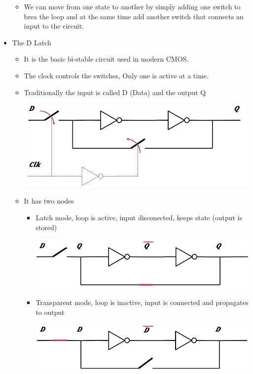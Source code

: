 \documentclass[a4paper]{article}
\begin{document}
\begin{itemize}
\begin{itemize}
\begin{center}
					\end{center}
				\item We can move from one state to another by simply adding one switch to brea the loop and at the same time add another switch that connects an input to the circuit.
			\end{itemize}
		\item The D Latch
			\begin{itemize}
				\item It is the basic bi-stable circuit used in modern CMOS.
				\item The clock controls the switches, Only one is active at a time.
				\item Traditionally the input is called D (Data) and the output Q\\
				\begin{center}
						\includegraphics[scale=0.95]{Figures/DLatch.jpg}
				\end{center}
				\item It has two nodes 
					\begin{itemize}
						\item Latch mode, loop is active, input disconected, keeps state (output is stored)\\
						\begin{center}
							\includegraphics[scale=1]{Figures/LatchMode.jpg}
						\end{center}
						\item Transparent mode, loop is inactive, input is connected and propagates to output\\
						\begin{center}
							\includegraphics[scale=1]{Figures/TransparentMode.jpg}

\end{center}
\end{itemize}
\end{itemize}
\end{itemize}
\end{document}
